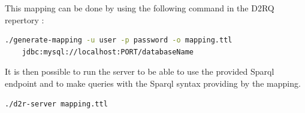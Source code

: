 \documentclass[a4paper,12pt]{article}
\begin{document}
This mapping can be done by using the following command in the D2RQ repertory :

\begin{lstlisting}[language=bash]
./generate-mapping -u user -p password -o mapping.ttl 
	jdbc:mysql://localhost:PORT/databaseName
\end{lstlisting}

It is then possible to run the server to be able to use the provided Sparql endpoint and to make queries with the Sparql syntax providing by the mapping.

\begin{lstlisting}
./d2r-server mapping.ttl
\end{lstlisting}
\end{document}
